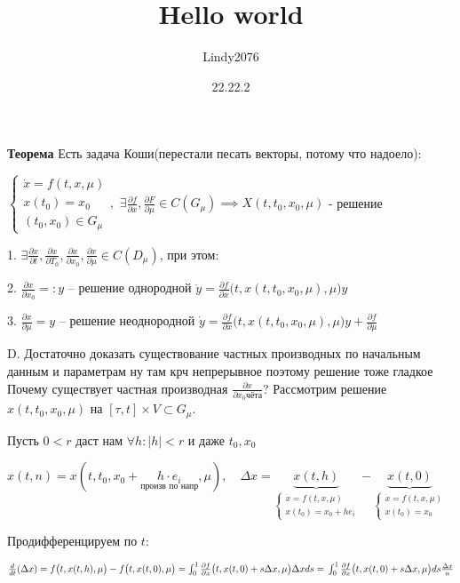 \documentclass[12pt, a4paper]{article}
\title{Hello world}
\author{Lindy2076}
\date{22.22.2} %
\begin{document}
  \textbf{Теорема} Есть задача Коши(перестали песать векторы, потому что надоело):

  $
  \begin{cases}
    \dot x = f(t, x, \mu)\\ x(t_0) = x_0\\
    (t_0, x_0) \in G_\mu
  \end{cases},$
  $\exists \frac{\partial f}{\partial x}, \frac{\partial F}{\partial \mu} \in C(G_\mu) \implies X(t, t_0, x_0, \mu) $ - решение

  1. $\exists \frac{\partial x}{\partial t}, \frac{\partial x}{\partial T_0}, \frac{\partial x}{\partial x_0}, \frac{\partial x}{\partial \mu} \in C(D_\mu)$, при этом:
  
  2. $\frac{\partial x }{\partial x_0} =: y $ -- решение однородной $\dot y = \frac{\partial f}{\partial x}\big(t, x(t, t_0, x_0, \mu), \mu\big)y $

  3. $\frac{\partial x}{\partial \mu} = y$ -- решение неоднородной $\dot y = \frac{\partial f}{\partial x}\big(t, x(t,t_0,x_0,\mu), \mu\big)y + \frac{\partial f}{\partial \mu}$

  D. Достаточно доказать существование частных производных по начальным данным и параметрам
  ну там крч непрерывное поэтому решение тоже гладкое
  Почему существует частная производная $\frac{\partial x}{\partial x_0{\text{чёта}}}$? Рассмотрим решение $x(t,t_0, x_0, \mu)$ на $[\tau, t]\times V\subset G_\mu$.

  Пусть $0 < r$ даст нам $\forall h: |h| < r $ и даже $t_0, x_0$
  
  $x(t, n) = x(t, t_0, x_0 + \underset{\text{произв по напр}}{h\cdot e_i}, \mu), \quad\Delta x = \underbrace{x(t,h)}_{\begin{cases}
    \dot x = f(t, x, \mu) \\ x(t_0) = x_0 + he_i
  \end{cases}} - \underbrace{x(t, 0)}_{\begin{cases}
    \dot x = f(t, x, \mu)\\x(t_0) = x_0
  \end{cases}}$

  Продифференцируем по $t$:

  $\frac{d}{dt}(\Delta x) = f\big(t, x(t,h), \mu\big) - f\big(t,x(t,0), \mu\big) = 
  \int^1_0 \frac{\partial f}{\partial x} \big(t, x(t, 0) + s\Delta x, \mu\big)\Delta x ds =\\
  \int^1_0 \frac{\partial f}{\partial x}\big(t, x(t,0) + s\Delta x, \mu\big)ds \frac{\Delta x}{n}
  $
\end{document}
